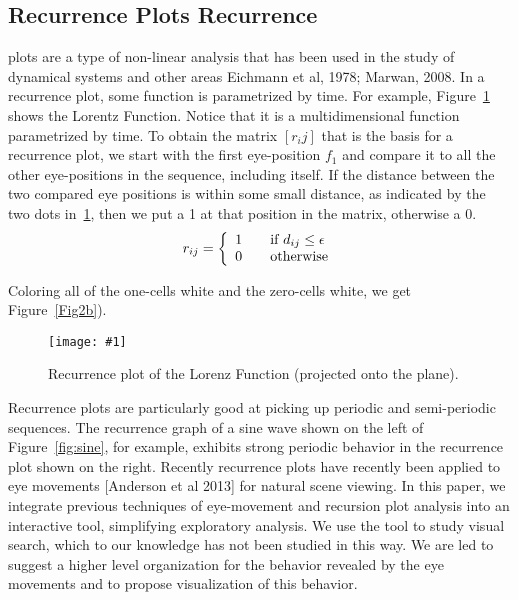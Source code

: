 \documentclass{sigchi}
\newcommand{\insertpicture}[2]{\begin{center}\texttt{[image: \#1]}\end{center}}
\begin{document}
	
	\subsection{Recurrence Plots Recurrence} plots are a type of non-linear
analysis that has been used in the study of dynamical systems and other
areas {Eichmann et al, 1978; Marwan, 2008}. In a recurrence plot, some
function is parametrized by time.  For example, Figure~\ref{fig:lorenz} 
shows the Lorentz Function. Notice that it is a multidimensional function
parametrized by time. To obtain the matrix $[r_ij]$ that is the basis for
a recurrence plot, we start with the first eye-position $f_1$  and compare
it to all the other eye-positions in the sequence, including itself. If the
distance  between the two compared eye positions is within some small
distance, as indicated by the two dots in~\ref{fig:lorenz},  then we put a 1 at
that position in the matrix, otherwise a 0. \[ r_{ij}  = \left\{
	\begin{array}{l l} 1  & \quad \text{if $d_{ij} \leq \epsilon$}\\ 0 &
		\quad \text{otherwise} \end{array} \right. \]

Coloring all of the one-cells white and the zero-cells white, we get
Figure~\ref{Fig2b}).

\begin{figure}

	\insertpicture{figures/lorenz.pdf}{0.45}
	\caption{Recurrence plot of the Lorenz Function (projected onto the
		plane).\label{fig:lorenz}}

\end{figure}



Recurrence plots are particularly good at picking up
periodic and semi-periodic sequences. The recurrence graph of a sine wave
shown on the left of Figure~\ref{fig:sine}, for example, exhibits strong
periodic behavior in the recurrence plot shown on the right. Recently
recurrence plots have recently been applied to eye movements [Anderson et
al 2013] for natural scene viewing. In this paper, we integrate previous
techniques of eye-movement and recursion plot analysis into an interactive
tool, simplifying exploratory analysis. We use the tool to study visual
search, which to our knowledge has not been studied in this way. We are led
to suggest a higher level organization for the behavior revealed by the eye
movements and to propose visualization of this behavior.  
\end{document}
